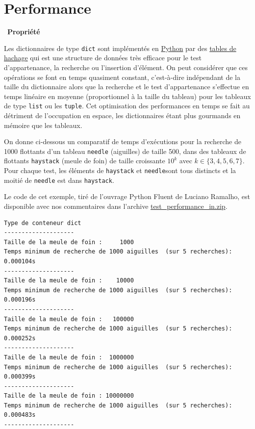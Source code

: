 \documentclass[
  11pt,
]{article}
\newcommand{\passthrough}[1]{#1}
\newcounter{prop}
\newenvironment{propriete}[1]
{\par \medskip   \addtocounter{prop}{1} \noindent  
\begin{bclogo}[arrondi =0.1,  ombre = true, barre=none, logo=\bcbook, marge=4]{~\textbf{Propriété} \textbf{\theprop} {\itshape #1} }   \par}
{
\end{bclogo}
 \par \bigskip }
\begin{document}
\hypertarget{performance}{%
\section{Performance}\label{performance}}

\begin{propriete}{}

Les dictionnaires de type \passthrough{\lstinline!dict!} sont
implémentés en
\href{https://docs.python.org/3/tutorial/datastructures.html}{Python}
par des \href{https://fr.wikipedia.org/wiki/Table_de_hachage}{tables de
hachage} qui est une structure de données très efficace pour le test
d'appartenance, la recherche ou l'insertion d'élément. On peut
considérer que ces opérations se font en temps quasiment constant,
c'est-à-dire indépendant de la taille du dictionnaire alors que la
recherche et le test d'appartenance s'effectue en temps linéaire en
moyenne (proportionnel à la taille du tableau) pour les tableaux de type
\passthrough{\lstinline!list!} ou les \passthrough{\lstinline!tuple!}.
Cet optimisation des performances en temps se fait au détriment de
l'occupation en espace, les dictionnaires étant plus gourmands en
mémoire que les tableaux.

On donne ci-dessous un comparatif de temps d'exécutions pour la
recherche de 1000 flottants d'un tableau
\passthrough{\lstinline!needle!} (aiguilles) de taille 500, dans des
tableaux de flottants \passthrough{\lstinline!haystack!} (meule de foin)
de taille croissante \(10^{k}\) avec \(k \in \{3,4,5,6,7\}\). Pour
chaque test, les éléments de \passthrough{\lstinline!haystack!} et
\passthrough{\lstinline!needle!}sont tous distincts et la moitié de
\passthrough{\lstinline!needle!} est dans
\passthrough{\lstinline!haystack!}.

Le code de cet exemple, tiré de l'ouvrage Python Fluent de Luciano
Ramalho, est disponible avec nos commentaires dans l'archive
\href{https://gitlab.com/frederic-junier/nsi/-/blob/master/TypesConstruits/Dictionnaires/Cours/ressources/test_performance_in.zip}{test\_performance\_in.zip}.

\begin{lstlisting}
Type de conteneur dict
--------------------
Taille de la meule de foin :     1000
Temps minimum de recherche de 1000 aiguilles  (sur 5 recherches): 0.000104s
--------------------
Taille de la meule de foin :    10000
Temps minimum de recherche de 1000 aiguilles  (sur 5 recherches): 0.000196s
--------------------
Taille de la meule de foin :   100000
Temps minimum de recherche de 1000 aiguilles  (sur 5 recherches): 0.000252s
--------------------
Taille de la meule de foin :  1000000
Temps minimum de recherche de 1000 aiguilles  (sur 5 recherches): 0.000399s
--------------------
Taille de la meule de foin : 10000000
Temps minimum de recherche de 1000 aiguilles  (sur 5 recherches): 0.000483s
--------------------


\end{lstlisting}
\end{propriete}
\end{document}

